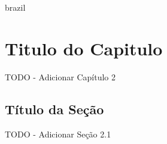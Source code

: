 

\begin{otherlanguage*}{brazil}

    \chapter{Titulo do Capitulo}

    TODO - Adicionar Capítulo 2


    \section{Título da Seção}

    TODO - Adicionar Seção 2.1

\end{otherlanguage*}

